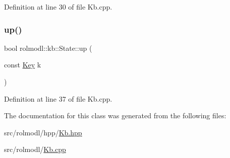 Definition at line 30 of file Kb.\+cpp.

\mbox{\label{classrolmodl_1_1rolmodl_1_1kb_1_1_state_ad8aeacf2208af68e2336fa17375e6ce4}} 
\subsubsection{\texorpdfstring{up()}{up()}\hspace{0.1cm}{\footnotesize\ttfamily [2/2]}}
{\footnotesize\ttfamily bool rolmodl\+::kb\+::\+State\+::up (\begin{DoxyParamCaption}\item[{const \mbox{\hyperlink{namespacerolmodl_1_1rolmodl_1_1kb_a188e00b289aeb95ae45fb6bf2923e7e2}{Key}}}]{k }\end{DoxyParamCaption})\hspace{0.3cm}{\ttfamily [static]}}



Definition at line 37 of file Kb.\+cpp.



The documentation for this class was generated from the following files\+:\begin{DoxyCompactItemize}
\item 
src/rolmodl/hpp/\mbox{\hyperlink{_kb_8hpp}{Kb.\+hpp}}\item 
src/rolmodl/\mbox{\hyperlink{_kb_8cpp}{Kb.\+cpp}}\end{DoxyCompactItemize}
